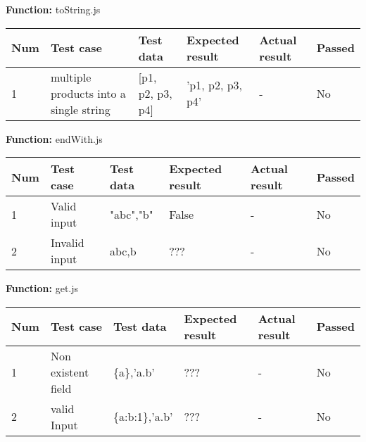 \documentclass[a4paper, 12pt]{article}
\begin{document}
        \textbf{Function:} toString.js
        
        \begin{table}[h!]
           \begin{tabular}{|l|p{3cm}|p{2cm}|p{2cm}|p{2.5cm}|l|}
                \hline
                Num & Test case        										& Test data 					& Expected result 					& Actual result 		& Passed \\ \hline
                1   & multiple products into a single string 				& {[}p1, p2, p3, p4{]}     		& 'p1, p2, p3, p4'                	& -             		& No     \\ \hline
            \end{tabular}
        \end{table}
    
        \textbf{Function:} endWith.js
        
        \begin{table}[h!]
           \begin{tabular}{|l|p{3cm}|p{2cm}|p{2cm}|p{2.5cm}|l|}
                \hline
                Num & Test case        					& Test data 					& Expected result 					& Actual result 		& Passed \\ \hline
                1   & Valid input 						& "abc","b"      				& False                				& -             		& No     \\ \hline
                2   & Invalid input 					& abc,b     					& ???               				& -             		& No     \\ \hline
            \end{tabular}
        \end{table}
    
        \textbf{Function:} get.js
        
        \begin{table}[h!]
           \begin{tabular}{|l|p{3cm}|p{2cm}|p{2cm}|p{2.5cm}|l|}
                \hline
                Num & Test case        					& Test data 					& Expected result 					& Actual result 		& Passed \\ \hline
                1   & Non  existent field 				& \{a\},'a.b'     				& ???               				& -             		& No     \\ \hline
                2   & valid Input 						& \{a:b:1\},'a.b'     			& ???               				& -             		& No     \\ \hline
            \end{tabular}
        \end{table}
    
\end{document}
